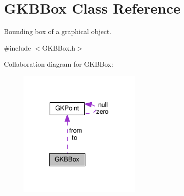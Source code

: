 \hypertarget{classGKBBox}{}\section{G\+K\+B\+Box Class Reference}
\label{classGKBBox}


Bounding box of a graphical object.  




{\ttfamily \#include $<$G\+K\+B\+Box.\+h$>$}



Collaboration diagram for G\+K\+B\+Box\+:
\nopagebreak
\begin{figure}[H]
\begin{center}
\leavevmode
\includegraphics[width=171pt]{classGKBBox__coll__graph}
\end{center}
\end{figure}
